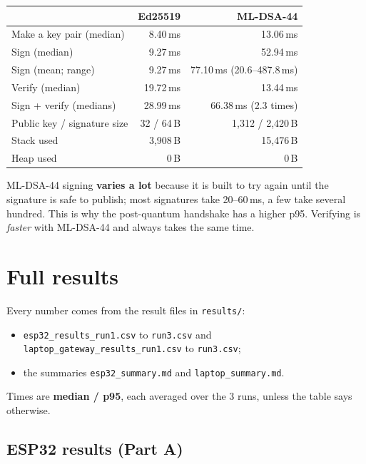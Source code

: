 \documentclass[10pt,a4paper]{article}
\begin{document}
\begin{table}[H]\centering\small
\begin{tabular}{lrr}
\toprule
 & Ed25519 & ML-DSA-44 \\
\midrule
Make a key pair (median) & 8.40\,ms & 13.06\,ms \\
Sign (median) & 9.27\,ms & 52.94\,ms \\
Sign (mean; range) & 9.27\,ms & 77.10\,ms (20.6--487.8\,ms) \\
Verify (median) & 19.72\,ms & 13.44\,ms \\
Sign + verify (medians) & 28.99\,ms & 66.38\,ms (2.3 times) \\
Public key / signature size & 32 / 64\,B & 1,312 / 2,420\,B \\
Stack used & 3,908\,B & 15,476\,B \\
Heap used & 0\,B & 0\,B \\
\bottomrule
\end{tabular}
\end{table}

ML-DSA-44 signing \textbf{varies a lot} because it is built to try again until the signature is safe to
publish; most signatures take 20--60\,ms, a few take several hundred. This is why the post-quantum
handshake has a higher p95. Verifying is \emph{faster} with ML-DSA-44 and always takes the same time.

\section*{Full results}

Every number comes from the result files in \texttt{results/}:
\begin{itemize}[nosep]
  \item \texttt{esp32\_results\_run1.csv} to \texttt{run3.csv} and \texttt{laptop\_gateway\_results\_run1.csv} to \texttt{run3.csv};
  \item the summaries \texttt{esp32\_summary.md} and \texttt{laptop\_summary.md}.
\end{itemize}
Times are \textbf{median / p95}, each averaged over the 3 runs, unless the table says otherwise.

\subsection*{ESP32 results (Part A)}
\end{document}
